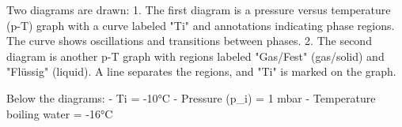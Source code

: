Two diagrams are drawn:  
1. The first diagram is a pressure versus temperature (p-T) graph with a curve labeled "Ti" and annotations indicating phase regions. The curve shows oscillations and transitions between phases.  
2. The second diagram is another p-T graph with regions labeled "Gas/Fest" (gas/solid) and "Flüssig" (liquid). A line separates the regions, and "Ti" is marked on the graph.  

Below the diagrams:  
- Ti = -10°C  
- Pressure (p_i) = 1 mbar  
- Temperature boiling water = -16°C
